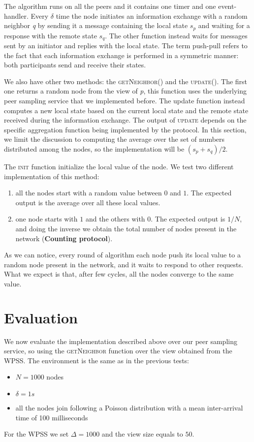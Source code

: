 The algorithm runs on all the peers and it contains one timer and one event-handler. Every $\delta$ time the node initiates an information exchange with a random neighbor \textit{q} by sending it a message containing the local state $s_p$ and waiting for a response with the remote state $s_q$. The other function instead waits for messages sent by an initiator and replies with the local state. The term push-pull refers to the fact that each information exchange is performed in a symmetric manner: both participants send and receive their states.

We also have other two methods: the \textsc{getNeighbor()} and the \textsc{update()}. The first one returns a random node from the view of \textit{p}, this function uses the underlying peer sampling service that we implemented before. The update function instead computes a new local state based on the current local state and the remote state received during the information exchange. The output of \textsc{update} depends on the specific aggregation function being implemented by the protocol. In this section, we limit the discussion to computing the average over the set of numbers distributed among the nodes, so the implementation will be $(s_p + s_q) / 2$. 

The \textsc{init} function initialize the local value of the node. We test two different implementation of this method: 
\begin{enumerate}
	\item all the nodes start with a random value between $0$ and $1$. The expected output is the average over all these local values.
	\item one node starts with $1$ and the others with $0$. The expected output is $1/N$, and doing the inverse we obtain the total number of nodes present in the network (\textbf{Counting protocol}).
\end{enumerate}

As we can notice, every round of algorithm each node push its local value to a random node present in the network, and it waits to respond to other requests. What we expect is that, after few cycles, all the nodes converge to the same value. 

\section{Evaluation}
\label{sec:evaluation_aggregation}
We now evaluate the implementation described above over our peer sampling service, so using the \textsc{getNeighbor} function over the view obtained from the WPSS. The environment is the same as in the previous tests:
\begin{itemize}
	\item $N = 1000$ nodes
	\item $\delta = 1s$
	\item all the nodes join following a Poisson distribution with a mean inter-arrival time of 100 milliseconds
\end{itemize}

For the WPSS we set $\Delta = 1000$ and the view size equals to $50$.